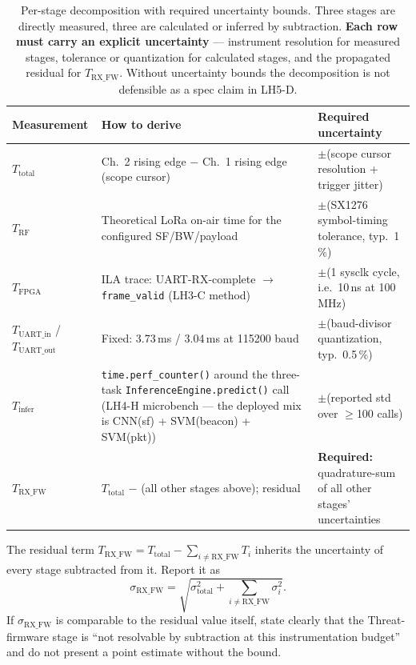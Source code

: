 \documentclass[11pt,letterpaper]{article}
\begin{document}
\begin{table}[h!]
	\centering
	\renewcommand{\arraystretch}{1.3}
	\begin{tabularx}{\textwidth}{l X l}
		\toprule
		\textbf{Measurement} & \textbf{How to derive} & \textbf{Required uncertainty} \\
		\midrule
		$T_{\text{total}}$        & Ch.~2 rising edge $-$ Ch.~1 rising edge (scope cursor) & $\pm$(scope cursor resolution + trigger jitter) \\
		$T_{\text{RF}}$           & Theoretical LoRa on-air time for the configured SF/BW/payload & $\pm$(SX1276 symbol-timing tolerance, typ.\ 1\,\%) \\
		$T_{\text{FPGA}}$         & \mbox{ILA} trace: UART-RX-complete $\to$ \texttt{frame\_valid} (LH3-C method) & $\pm$(1 sysclk cycle, i.e.\ 10\,ns at 100\,MHz) \\
		$T_{\text{UART\_in}}$ / $T_{\text{UART\_out}}$ & Fixed: 3.73\,ms / 3.04\,ms at 115200 baud & $\pm$(baud-divisor quantization, typ.\ 0.5\,\%) \\
		$T_{\text{infer}}$        & \texttt{time.perf\_counter()} around the three-task \texttt{InferenceEngine.predict()} call (LH4-H microbench --- the deployed mix is CNN(sf) + SVM(beacon) + SVM(pkt)) & $\pm$(reported std over $\geq$100 calls) \\
		$T_{\text{RX\_FW}}$       & $T_{\text{total}}$ $-$ (all other stages above); residual & \textbf{Required:} quadrature-sum of all other stages' uncertainties \\
		\bottomrule
	\end{tabularx}
	\caption{Per-stage decomposition with required uncertainty bounds. Three stages are directly measured, three are calculated or inferred by subtraction. \textbf{Each row must carry an explicit uncertainty} --- instrument resolution for measured stages, tolerance or quantization for calculated stages, and the propagated residual for $T_{\text{RX\_FW}}$. Without uncertainty bounds the decomposition is not defensible as a spec claim in LH5-D.}
\end{table}

\begin{tcolorbox}[warning={Uncertainty Propagation for the Residual Stage}]
The residual term $T_{\text{RX\_FW}} = T_{\text{total}} - \sum_{i \neq \text{RX\_FW}} T_i$ inherits the uncertainty of every stage subtracted from it. Report it as
\[
\sigma_{\text{RX\_FW}} = \sqrt{\sigma_{\text{total}}^2 + \sum_{i \neq \text{RX\_FW}} \sigma_i^2}.
\]
If $\sigma_{\text{RX\_FW}}$ is comparable to the residual value itself, state clearly that the Threat-firmware stage is ``not resolvable by subtraction at this instrumentation budget'' and do not present a point estimate without the bound.
\end{tcolorbox}
\end{document}
